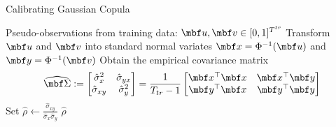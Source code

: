 \documentclass[12pt,a4paper]{article}
\begin{document}

\begin{algorithm}[H]
\label{alg:calibrating_gaussian}
\caption{Calibrating Gaussian Copula}
\begin{algorithmic}[1]
\Require Pseudo-observations from training data: $\mbf u,\mbf v\in [0,1]^{T^{tr}}$
\State Transform $\mbf u$ and $\mbf v$ into standard normal variates $\mbf x=\Phi^{-1}(\mbf u)$ and $\mbf y=\Phi^{-1}(\mbf v)$%
\State Obtain the empirical covariance matrix 
$$
\widehat{\mbf \Sigma} 
:=\begin{bmatrix} 
			\hat \sigma_{x}^2 & \hat \sigma_{yx} \\
			\hat \sigma_{xy} & \hat \sigma_{y}^2
		\end{bmatrix}
= \frac{1}{T_{tr}-1}\begin{bmatrix} \mbf x^\top\mbf x & \mbf x^\top\mbf y \\ \mbf y^\top\mbf x & \mbf y^\top\mbf y \end{bmatrix}$$
\State Set $\displaystyle \hat \rho \gets \frac{\hat \sigma_{xy}}{\hat \sigma_x \hat \sigma_y}$
\Ensure $\hat \rho$
\end{algorithmic}
\end{algorithm}
\end{document}
